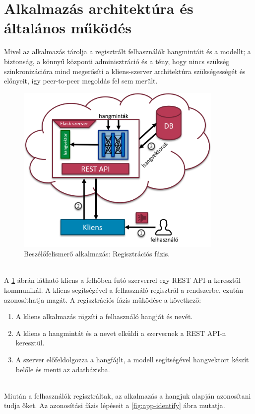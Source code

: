 \section{Alkalmazás architektúra és általános működés}

Mivel az alkalmazás tárolja a regisztrált felhasználók hangmintáit és a modellt; a biztonság, a könnyű központi adminisztráció és a tény, hogy nincs szükség szinkronizációra mind megerősíti a kliens-szerver architektúra szükségességét és előnyeit, így peer-to-peer megoldás fel sem merült.

\begin{figure}[H]
	\centering
	\includegraphics[width=100mm, keepaspectratio]{figures/app-register.png}
	\caption{Beszélőfelismerő alkalmazás: Regisztrációs fázis.}
	\label{fig:app-register}
\end{figure}
\ \\
A \ref{fig:app-register} ábrán látható kliens a felhőben futó szerverrel egy REST API-n keresztül kommunikál. A kliens segítségével a felhasználó regisztrál a rendszerbe, ezután azonosíthatja magát. A regisztrációs fázis működése a következő:

\begin{enumerate}
	\item A kliens alkalmazás rögzíti a felhasználó hangját és nevét.
	\item A kliens a hangmintát és a nevet elküldi a szervernek a REST API-n keresztül.
	\item A szerver előfeldolgozza a hangfájlt, a modell segítségével hangvektort készít belőle és menti az adatbázisba. 
\end{enumerate}
\ \\
Miután a felhasználók regisztráltak, az alkalmazás a hangjuk alapján azonosítani tudja őket. Az azonosítási fázis lépéseit a \ref{fig:app-identify} ábra mutatja.

